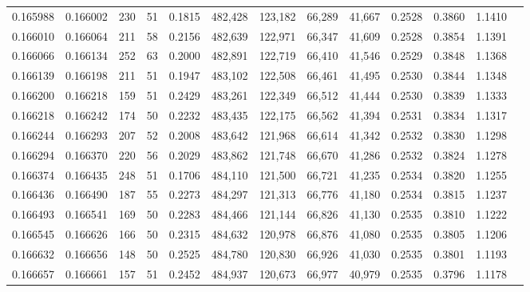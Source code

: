 \begin{tabular}{rrrrrrrrrrrrr}
0.165988 & 0.166002 &   230 &  51 &                                     0.1815 & 482,428 & 123,182 &  66,289 &  41,667 & 0.2528 & 0.3860 & 1.1410 \\
0.166010 & 0.166064 &   211 &  58 &                                     0.2156 & 482,639 & 122,971 &  66,347 &  41,609 & 0.2528 & 0.3854 & 1.1391 \\
0.166066 & 0.166134 &   252 &  63 &                                     0.2000 & 482,891 & 122,719 &  66,410 &  41,546 & 0.2529 & 0.3848 & 1.1368 \\
0.166139 & 0.166198 &   211 &  51 &                                     0.1947 & 483,102 & 122,508 &  66,461 &  41,495 & 0.2530 & 0.3844 & 1.1348 \\
0.166200 & 0.166218 &   159 &  51 &                                     0.2429 & 483,261 & 122,349 &  66,512 &  41,444 & 0.2530 & 0.3839 & 1.1333 \\
0.166218 & 0.166242 &   174 &  50 &                                     0.2232 & 483,435 & 122,175 &  66,562 &  41,394 & 0.2531 & 0.3834 & 1.1317 \\
0.166244 & 0.166293 &   207 &  52 &                                     0.2008 & 483,642 & 121,968 &  66,614 &  41,342 & 0.2532 & 0.3830 & 1.1298 \\
0.166294 & 0.166370 &   220 &  56 &                                     0.2029 & 483,862 & 121,748 &  66,670 &  41,286 & 0.2532 & 0.3824 & 1.1278 \\
0.166374 & 0.166435 &   248 &  51 &                                     0.1706 & 484,110 & 121,500 &  66,721 &  41,235 & 0.2534 & 0.3820 & 1.1255 \\
0.166436 & 0.166490 &   187 &  55 &                                     0.2273 & 484,297 & 121,313 &  66,776 &  41,180 & 0.2534 & 0.3815 & 1.1237 \\
0.166493 & 0.166541 &   169 &  50 &                                     0.2283 & 484,466 & 121,144 &  66,826 &  41,130 & 0.2535 & 0.3810 & 1.1222 \\
0.166545 & 0.166626 &   166 &  50 &                                     0.2315 & 484,632 & 120,978 &  66,876 &  41,080 & 0.2535 & 0.3805 & 1.1206 \\
0.166632 & 0.166656 &   148 &  50 &                                     0.2525 & 484,780 & 120,830 &  66,926 &  41,030 & 0.2535 & 0.3801 & 1.1193 \\
0.166657 & 0.166661 &   157 &  51 &                                     0.2452 & 484,937 & 120,673 &  66,977 &  40,979 & 0.2535 & 0.3796 & 1.1178 \\

\end{tabular}
